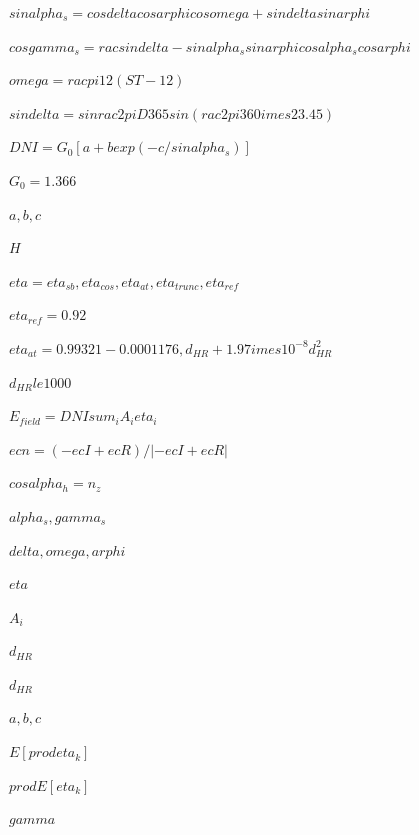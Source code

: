 
$sinalpha_s=cosdeltacosarphicosomega+sindeltasinarphi$

$cosgamma_s=rac{sindelta-sinalpha_ssinarphi}{cosalpha_scosarphi}$

$omega=rac{pi}{12}(ST-12)$

$sindelta=sinrac{2pi D}{365}sin(rac{2pi}{360}	imes23.45)$

$DNI=G_0[a+bexp(-c/sinalpha_s)]$

$G_0=1.366$

$a,b,c$

$H$

$eta=eta_{sb},eta_{cos},eta_{at},eta_{trunc},eta_{ref}$

$eta_{ref}=0.92$

$eta_{at}=0.99321-0.0001176,d_{HR}+1.97	imes10^{-8}d_{HR}^2$

$d_{HR}le1000$

$E_{field}=DNIsum_i A_ieta_i$

$ec n=(-ec I+ec R)/|-ec I+ec R|$

$cosalpha_h=n_z$

$alpha_s,gamma_s$

$delta,omega,arphi$

$eta$

$A_i$

$d_{HR}$

$d_{HR}$

$a,b,c$

$E[prodeta_k]$

$prod E[eta_k]$

$gamma$
